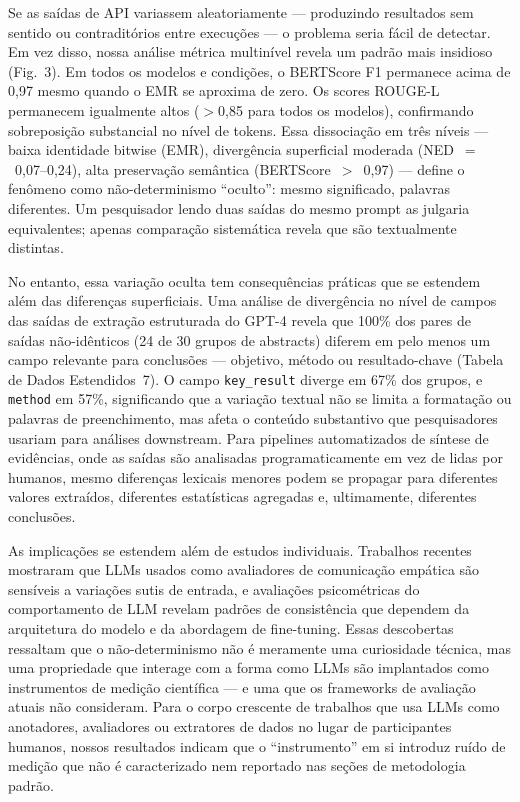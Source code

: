 \documentclass[12pt,a4paper]{article}
\begin{document}
Se as saídas de API variassem aleatoriamente --- produzindo resultados sem sentido ou contraditórios entre execuções --- o problema seria fácil de detectar.
Em vez disso, nossa análise métrica multinível revela um padrão mais insidioso (Fig.~3).
Em todos os modelos e condições, o BERTScore F1 permanece acima de 0,97 mesmo quando o EMR se aproxima de zero.
Os scores ROUGE-L permanecem igualmente altos ($>$0,85 para todos os modelos), confirmando sobreposição substancial no nível de tokens.
Essa dissociação em três níveis --- baixa identidade bitwise (EMR), divergência superficial moderada (NED~$=$~0,07--0,24), alta preservação semântica (BERTScore~$>$~0,97) --- define o fenômeno como não-determinismo ``oculto'': mesmo significado, palavras diferentes.
Um pesquisador lendo duas saídas do mesmo prompt as julgaria equivalentes; apenas comparação sistemática revela que são textualmente distintas.

No entanto, essa variação oculta tem consequências práticas que se estendem além das diferenças superficiais.
Uma análise de divergência no nível de campos das saídas de extração estruturada do GPT-4 revela que 100\% dos pares de saídas não-idênticos (24 de 30 grupos de abstracts) diferem em pelo menos um campo relevante para conclusões --- objetivo, método ou resultado-chave (Tabela de Dados Estendidos~7).
O campo \texttt{key\_result} diverge em 67\% dos grupos, e \texttt{method} em 57\%, significando que a variação textual não se limita a formatação ou palavras de preenchimento, mas afeta o conteúdo substantivo que pesquisadores usariam para análises downstream.
Para pipelines automatizados de síntese de evidências, onde as saídas são analisadas programaticamente em vez de lidas por humanos, mesmo diferenças lexicais menores podem se propagar para diferentes valores extraídos, diferentes estatísticas agregadas e, ultimamente, diferentes conclusões.

As implicações se estendem além de estudos individuais.
Trabalhos recentes mostraram que LLMs usados como avaliadores de comunicação empática são sensíveis a variações sutis de entrada, e avaliações psicométricas do comportamento de LLM revelam padrões de consistência que dependem da arquitetura do modelo e da abordagem de fine-tuning.
Essas descobertas ressaltam que o não-determinismo não é meramente uma curiosidade técnica, mas uma propriedade que interage com a forma como LLMs são implantados como instrumentos de medição científica --- e uma que os frameworks de avaliação atuais não consideram.
Para o corpo crescente de trabalhos que usa LLMs como anotadores, avaliadores ou extratores de dados no lugar de participantes humanos, nossos resultados indicam que o ``instrumento'' em si introduz ruído de medição que não é caracterizado nem reportado nas seções de metodologia padrão.
\end{document}
